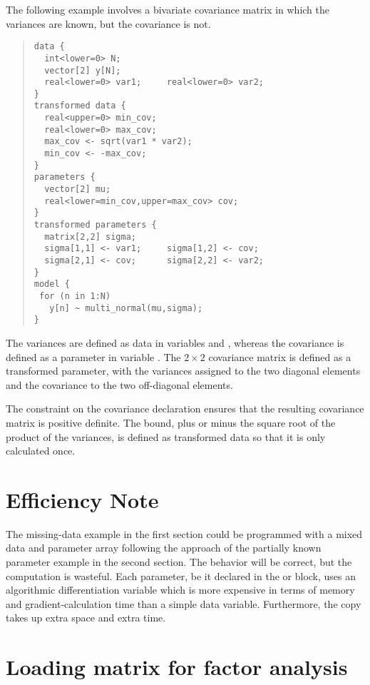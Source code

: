 The following example involves a bivariate covariance matrix in which the
variances are known, but the covariance is not.
%
\begin{quote}
\begin{Verbatim}[fontsize=\small]
data {
  int<lower=0> N;
  vector[2] y[N];
  real<lower=0> var1;     real<lower=0> var2;
}
transformed data {
  real<upper=0> min_cov;   
  real<lower=0> max_cov;  
  max_cov <- sqrt(var1 * var2);  
  min_cov <- -max_cov;
}
parameters {
  vector[2] mu;
  real<lower=min_cov,upper=max_cov> cov;
}
transformed parameters {
  matrix[2,2] sigma;
  sigma[1,1] <- var1;     sigma[1,2] <- cov;
  sigma[2,1] <- cov;      sigma[2,2] <- var2;
}  
model {
 for (n in 1:N)
   y[n] ~ multi_normal(mu,sigma);
}
\end{Verbatim}
\end{quote}
%
The variances are defined as data in variables  and
, whereas the covariance is defined as a parameter in
variable .  The $2 \times 2$ covariance matrix
 is defined as a transformed parameter, with the variances
assigned to the two diagonal elements and the covariance to the two
off-diagonal elements.

The constraint on the covariance declaration ensures that the
resulting covariance matrix  is positive definite.  The
bound, plus or minus the square root of the product of the variances,
is defined as transformed data so that it is only calculated once.

\section{Efficiency Note}

The missing-data example in the first section could be programmed with
a mixed data and parameter array following the approach of the
partially known parameter example in the second section.  The behavior
will be correct, but the computation is wasteful.  Each parameter, be
it declared in the  or 
block, uses an algorithmic differentiation variable which is more
expensive in terms of memory and gradient-calculation time than a
simple data variable.  Furthermore, the copy takes up extra space and
extra time.

\section{Loading matrix for factor analysis}

